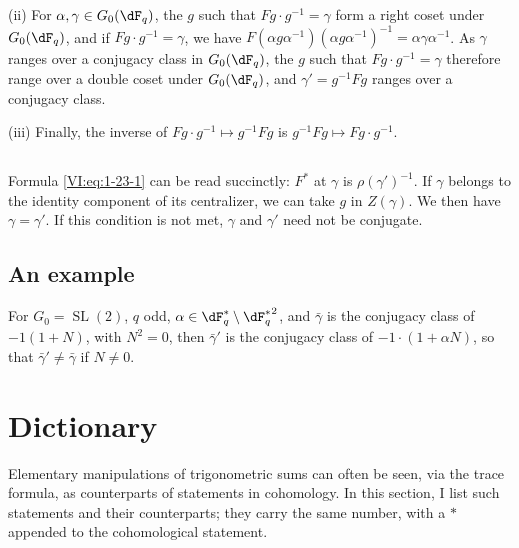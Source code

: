(ii) For $\alpha,\gamma\in G_0(\dF_q)$, the $g$ such that 
$F g\cdot g^{-1} = \gamma$ form a right coset under $G_0(\dF_q)$, and 
if $F g\cdot g^{-1} = \gamma$, we have 
$F(\alpha g \alpha^{-1})(\alpha g \alpha^{-1})^{-1} = \alpha \gamma\alpha^{-1}$. 
As $\gamma$ ranges over a conjugacy class in $G_0(\dF_q)$, the $g$ 
such that $F g\cdot g^{-1} = \gamma$ therefore range over a double coset under 
$G_0(\dF_q)$, and $\gamma'= g^{-1} F g$ ranges over a conjugacy class. 

(iii) Finally, the inverse of $F g\cdot g^{-1}\mapsto g^{-1} F g$ is 
$g^{-1} F g\mapsto F g\cdot g^{-1}$. 





\subsection{}\label{VI:1-25}

Formula \eqref{VI:eq:1-23-1} can be read succinctly: $F^\ast$ at 
$\gamma$ is $\rho(\gamma')^{-1}$. If $\gamma$ belongs to the identity component 
of its centralizer, we can take $g$ in $Z(\gamma)$. We then have 
$\gamma=\gamma'$. If this condition is not met, $\gamma$ and $\gamma'$ 
need not be conjugate. 





\subsection{An example}\label{VI:1-26}

For $G_0=\operatorname{SL}(2)$, $q$ odd, 
$\alpha\in \dF_q^\ast\setminus {\dF_q^\ast}^2$, and $\bar\gamma$ is the 
conjugacy class of $-1(1+N)$, with $N^2=0$, then $\bar\gamma'$ is the 
conjugacy class of $-1\cdot (1+\alpha N)$, so that $\bar\gamma'\ne \bar\gamma$ 
if $N\ne 0$. 











\section{Dictionary}\label{VI:2}

Elementary manipulations of trigonometric sums can often 
be seen, via the trace formula, as counterparts of statements 
in cohomology. In this section, I list such statements and their 
counterparts; they carry the same number, with a $\ast$ appended to 
the cohomological statement. 






